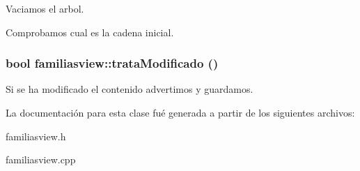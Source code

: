 Vaciamos el arbol.

Comprobamos cual es la cadena inicial. 
\subsubsection{\setlength{\rightskip}{0pt plus 5cm}bool familiasview::trata\-Modificado ()}\label{classfamiliasview_a8}


Si se ha modificado el contenido advertimos y guardamos. 

La documentaci\'{o}n para esta clase fu\'{e} generada a partir de los siguientes archivos:\begin{CompactItemize}
\item 
familiasview.h\item 
familiasview.cpp\end{CompactItemize}
